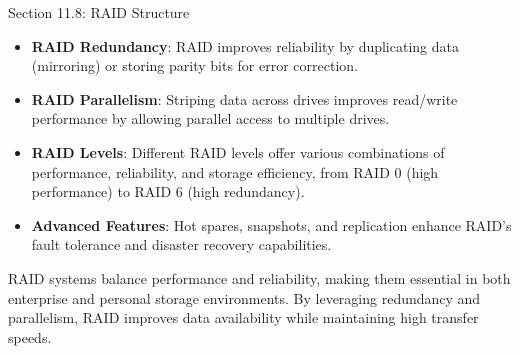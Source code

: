 \begin{notes}{Section 11.8: RAID Structure}
\begin{highlight}
        \begin{itemize}
            \item \textbf{RAID Redundancy}: RAID improves reliability by duplicating data (mirroring) or storing parity bits for error correction.
            \item \textbf{RAID Parallelism}: Striping data across drives improves read/write performance by allowing parallel access to multiple drives.
            \item \textbf{RAID Levels}: Different RAID levels offer various combinations of performance, reliability, and storage efficiency, from RAID 0 (high performance) to RAID 6 (high redundancy).
            \item \textbf{Advanced Features}: Hot spares, snapshots, and replication enhance RAID’s fault tolerance and disaster recovery capabilities.
        \end{itemize}
    
    RAID systems balance performance and reliability, making them essential in both enterprise and personal storage environments. By leveraging redundancy and parallelism, RAID improves data 
    availability while maintaining high transfer speeds.
    
    \end{highlight}

\end{notes}